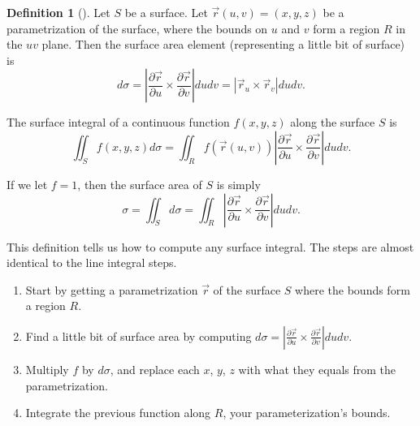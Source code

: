 \documentclass[10pt,]{book}
\theoremstyle{plain}
\theoremstyle{definition}
\newtheorem{definition}[theorem]{Definition}
\theoremstyle{definition}
\theoremstyle{definition}
\theoremstyle{definition}
\theoremstyle{definition}
\numberwithin{equation}{section}
\begin{document}
\begin{definition}[{}]\label{definition-45}
Let \(S\) be a surface. Let \(\vec r(u,v)=(x,y,z)\) be a parametrization of the surface, where the bounds on \(u\) and \(v\) form a region \(R\) in the \(uv\) plane. Then the surface area element (representing a little bit of surface) is%
\begin{equation*}
d\sigma =\left |\frac{\partial \vec r}{\partial u} \times \frac{\partial \vec r}{\partial v}\right| dudv = \left|\vec r_u\times\vec r_v\right|dudv.
\end{equation*}
%
\par
The surface integral of a continuous function \(f(x,y,z)\) along the surface \(S\) is%
\begin{equation*}
\iint_S f(x,y,z) d\sigma = \iint_R f(\vec r(u,v)) \left |\frac{\partial \vec r}{\partial u} \times \frac{\partial \vec r}{\partial v}\right| dudv.
\end{equation*}
%
\par
If we let \(f=1\), then the surface area of \(S\) is simply%
\begin{equation*}
\sigma = \iint_S d\sigma = \iint_R \left |\frac{\partial \vec r}{\partial u} \times \frac{\partial \vec r}{\partial v}\right| dudv.
\end{equation*}
%
\end{definition}
This definition tells us how to compute any surface integral. The steps are almost identical to the line integral steps. \leavevmode%
\begin{enumerate}
\item\hypertarget{li-219}{}Start by getting a parametrization \(\vec r\) of the surface \(S\) where the bounds form a region \(R\).%
\item\hypertarget{li-220}{}Find a little bit of surface area by computing \(d\sigma =\left |\frac{\partial \vec r}{\partial u} \times \frac{\partial \vec r}{\partial v}\right| dudv.\)%
\item\hypertarget{li-221}{}Multiply \(f\) by \(d\sigma\), and replace each \(x\), \(y\), \(z\) with what they equals from the parametrization.%
\item\hypertarget{li-222}{}Integrate the previous function along \(R\), your parameterization's bounds.%
\end{enumerate}
%
\end{document}
